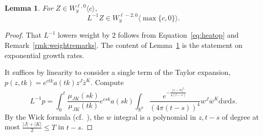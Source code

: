 \documentclass{article}
\newcommand{\di}{\mathrm{d}}
\newcommand{\real}{\mathbb{R}}
\newcommand{\inv}{^{-1}}
\newcommand{\TD}{T}
\newtheorem{lemma}[theorem]{Lemma}
\theoremstyle{definition}
\theoremstyle{remark}
\begin{document}
\begin{lemma}
    \label{lem:weightbasic}
    For $Z \in W^{\ell,0}_y\langle c \rangle$,
    \[
        L\inv Z \in W^{\ell-2,0}_y\langle \max\{c,0\}\rangle.
    \]
\end{lemma}
\begin{proof}
    That $L\inv$ lowers weight by 2 follows from Equation~\eqref{eq:heatop} and Remark~\ref{rmk:weightremarks}.
    The content of Lemma~\ref{lem:weightbasic} is the statement on exponential growth rates.

    It suffices by linearity to consider a single term of the Taylor expansion, $p(z, tk) = e^{ctk} a(tk) z^J \overline{z}^K$.
    Compute
    \begin{equation}
        \label{eq:linvp}
        L\inv p =  \int_0^t \frac{\mu_{JK}(sk)}{\mu_{JK}(tk)} e^{csk} a(sk) \int_{\real^8} \frac{e^{-\frac{|z-w|^2}{4(t-s)}}}{(4\pi(t-s))^4}  w^J \overline{w}^K \di w \di s.
    \end{equation}
    By the Wick formula (cf.~\cite[Theorem 3.2.5]{landoGraphsSurfacesTheir2004}), the $w$ integral is a polynomial in $z, t-s$ of degree at most $\frac{|J|+|K|}{2} \le \TD$ in $t-s$.


\end{proof}
\end{document}
